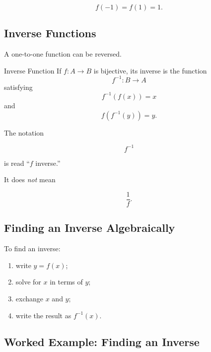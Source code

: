 \[ f(-1)=f(1)=1. \]

\subsection{Inverse Functions}
\label{subsec:inverse-functions-analysis}

A one-to-one function can be reversed.

\begin{definitionbox}{Inverse Function}
If \(f:A\to B\) is bijective, its inverse is the function
\[ f^{-1}:B\to A \]
satisfying
\[ f^{-1}(f(x))=x \]
and
\[ f(f^{-1}(y))=y. \]
\end{definitionbox}

The notation

\[ f^{-1} \]

is read ``\(f\) inverse.''

It does \emph{not} mean

\[ \frac1{f}. \]

\subsection{Finding an Inverse Algebraically}
\label{subsec:finding-inverses}

To find an inverse:

\begin{enumerate}
    \item write \(y=f(x)\);
    \item solve for \(x\) in terms of \(y\);
    \item exchange \(x\) and \(y\);
    \item write the result as \(f^{-1}(x)\).
\end{enumerate}

\subsection{Worked Example: Finding an Inverse}
\label{subsec:worked-inverse}


